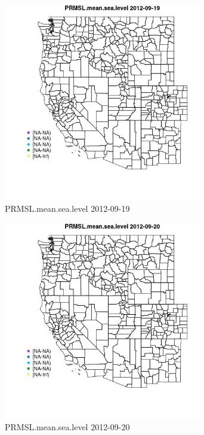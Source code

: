 \begin{figure} 
\centering  
\includegraphics[width=0.77\textwidth]{Code_Outputs/ML_input_report_ML_input_PM25_Step5_part_d_de_duplicated_aves_ML_input_MapObsPRMSLmeansealevel2012-09-19.jpg} 
\caption{\label{fig:ML_input_report_ML_input_PM25_Step5_part_d_de_duplicated_aves_ML_inputMapObsPRMSLmeansealevel2012-09-19}PRMSL.mean.sea.level 2012-09-19} 
\end{figure} 
 

\begin{figure} 
\centering  
\includegraphics[width=0.77\textwidth]{Code_Outputs/ML_input_report_ML_input_PM25_Step5_part_d_de_duplicated_aves_ML_input_MapObsPRMSLmeansealevel2012-09-20.jpg} 
\caption{\label{fig:ML_input_report_ML_input_PM25_Step5_part_d_de_duplicated_aves_ML_inputMapObsPRMSLmeansealevel2012-09-20}PRMSL.mean.sea.level 2012-09-20} 
\end{figure} 
 

